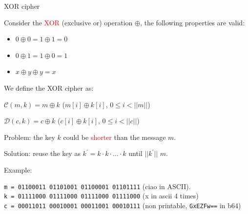 \begin{frame}{XOR cipher}

  Consider the \textcolor{red}{XOR} (exclusive or) operation $\oplus$, the following properties are valid:
  
  \begin{itemize}
    \item $0 \oplus 0 = 1 \oplus 1 = 0$ 
    \item $0 \oplus 1 = 1 \oplus 0 = 1$ 
    \item $x \oplus y \oplus y = x$ 
  \end{itemize}
  
  \medskip
  \pause
  
  We define the XOR cipher as:
    
  $\mathcal{C}(m, k) = m \oplus k$ \phantom{padding} ($m[i] \oplus k[i]$, $0 \leq i < ||m||$)
  
  $\mathcal{D}(c, k) = c \oplus k$ \phantom{padding} ($c[i] \oplus k[i]$, $0 \leq i < ||c||$)

  \medskip
  
  \pause

  Problem: the key $k$ could be \textcolor{red}{shorter} than the message $m$.
  
  Solution: reuse the key as $k^{'} = k \cdot k \cdot \ldots \cdot k$ until $||k^{'}||$ $m$.

  \medskip
  \pause
  
  Example:
  
  \texttt{m = 01100011 01101001 01100001 01101111} (ciao in ASCII).\\
  \texttt{k = 01111000 01111000 01111000 01111000} (x in ascii 4 times)\\
  \texttt{c = 00011011 00010001 00011001 00010111} (non printable, \texttt{GxEZFw==} in b64)
  
\end{frame}

